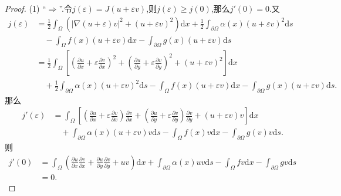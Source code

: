 \documentclass[a4paper,oneside,12pt]{ctexart}
\theoremstyle{plain}
\theoremstyle{nonumberplain}
\theoremstyle{nonumberplain}
\newtheorem{proof}{证明.}
\newcommand{\dif}{\mathrm{d}}
\newcommand{\ptl}{\partial}
\renewcommand{\epsilon}{\varepsilon}
\newcommand{\abs}[1]{\left\vert#1\right\vert}
\begin{document}
    \begin{proof}
        (1) ``$\Rightarrow$''.令$j(\epsilon)=J(u+\epsilon v)$,则$j(\epsilon)\geqslant j(0)$,那么$j'(0)=0$.又
        \begin{align*}
            j(\epsilon)&=\frac{1}{2}\int_\Omega (\abs{\nabla(u+\epsilon )v}^2+(u+\epsilon v)^2)\dif x+\frac{1}{2}\int_{\ptl \Omega}\alpha(x)(u+\epsilon v)^2\dif s\\
            &\quad -\int_\Omega f(x)(u+\epsilon v)\dif x-\int_{\ptl \Omega}g(x)(u+\epsilon v)\dif s\\
            &=\frac{1}{2}\int_\Omega\left[\left(\frac{\ptl u}{\ptl x}+\epsilon\frac{\ptl v}{\ptl x}\right)^2+\left(\frac{\ptl u}{\ptl y}+\epsilon\frac{\ptl v}{\ptl y}\right)^2+(u+\epsilon v)^2\right]\dif x\\
            &\quad +\frac{1}{2}\int_{\ptl \Omega}\alpha(x)(u+\epsilon v)^2\dif s-\int_\Omega f(x)(u+\epsilon v)\dif x-\int_{\ptl \Omega}g(x)(u+\epsilon v)\dif s.
        \end{align*}
        那么 
        \begin{align*}
            j'(\epsilon)&=\int_\Omega\left[\left(\frac{\ptl u}{\ptl x}+\epsilon\frac{\ptl v}{\ptl x}\right)\frac{\ptl v}{\ptl x}+\left(\frac{\ptl u}{\ptl y}+\epsilon\frac{\ptl v}{\ptl y}\right)\frac{\ptl v}{\ptl y}+(u+\epsilon v)v\right]\dif x\\
            &\quad +\int_{\ptl \Omega}\alpha(x)(u+\epsilon v)v\dif s-\int_\Omega f(x)v\dif x-\int_{\ptl \Omega}g(v)v\dif s.
        \end{align*}
        则
        \begin{align*}
            j'(0)&=\int_\Omega\left(\frac{\ptl u}{\ptl x}\frac{\ptl v}{\ptl x}+\frac{\ptl u}{\ptl y}\frac{\ptl v}{\ptl y}+uv\right)\dif x+\int_{\ptl \Omega}\alpha(x) uv\dif s-\int_\Omega fv\dif x-\int_{\ptl \Omega}gv\dif s\\
            &=0.
        \end{align*}


\end{proof}
\end{document}
